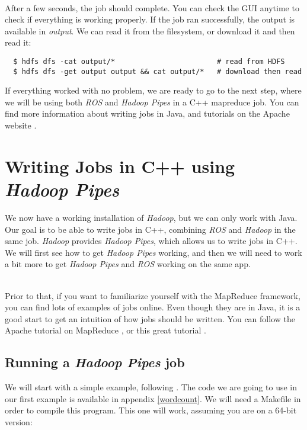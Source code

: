 \documentclass[a4paper, 12pt]{article}
\begin{document}
~\\
After a few seconds, the job should complete. You can check the GUI anytime to check if everything is working properly. If the job ran successfully, the output is available in \textit{output}. We can read it from the filesystem, or download it and then read it:

\begin{verbatim}
  $ hdfs dfs -cat output/*                        # read from HDFS
  $ hdfs dfs -get output output && cat output/*   # download then read
\end{verbatim}

If everything worked with no problem, we are ready to go to the next step, where we will be using both \textit{ROS} and \textit{Hadoop Pipes} in a C++ mapreduce job. You can find more information about writing jobs in Java, and tutorials on the Apache website \cite{hadoop_mapreduce_tutorial}.

\section{Writing Jobs in C++ using \textit{Hadoop Pipes}}

We now have a working installation of \textit{Hadoop}, but we can only work with Java. Our goal is to be able to write jobs in C++, combining \textit{ROS} and \textit{Hadoop} in the same job. \textit{Hadoop} provides \textit{Hadoop Pipes}, which allows us to write jobs in C++. We will first see how to get \textit{Hadoop Pipes} working, and then we will need to work a bit more to get \textit{Hadoop Pipes} and \textit{ROS} working on the same app. 

~\\
Prior to that, if you want to familiarize yourself with the MapReduce framework, you can find lots of examples of jobs online. Even though they are in Java, it is a good start to get an intuition of how jobs should be written. You can follow the Apache tutorial on MapReduce \cite{hadoop_mapreduce_tutorial}, or this great tutorial \cite{slideshare_tuto}.

  \subsection{Running a \textit{Hadoop Pipes} job}
  
We will start with a simple example, following \cite{smith_pipes}. The code we are going to use in our first example is available in appendix \ref{wordcount}. We will need a Makefile in order to compile this program. This one will work, assuming you are on a 64-bit version:
\end{document}
